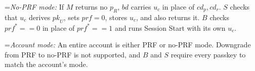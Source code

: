 \documentclass{article}
\newlength{\stanzagap}
\newlength{\notegap}
\newlength{\stanzawidth}
\newlength{\stanzabox}
\newenvironment{stanza}[1][\stanzawidth]
  {\par\addvspace{\stanzagap}%
   \setlength{\stanzabox}{\dimexpr\linewidth-\parindent\relax}%
   \ifdim\stanzabox>#1\setlength{\stanzabox}{#1}\fi
   \noindent\hspace*{\parindent}\begin{minipage}{\stanzabox}}
  {\end{minipage}\par\addvspace{\stanzagap}}
\begin{document}
\begin{stanza}
\vspace{\notegap}

{\leftskip=\parindent\noindent\textit{No-PRF mode:} If $M$ returns no $p_R$, $\mathit{bd}$ carries $u_c$ in place of $\mathit{cd}_p, \mathit{cd}_r$. $S$ checks that $u_c$ derives $\mathit{pk}_U$, sets $\mathit{prf} = 0$, stores $u_c$, and also returns it. $B$ checks $\mathit{prf}^* == 0$ in place of $\mathit{prf}^* == 1$ and runs Session Start with its own $u_c$.\par}

\vspace{\notegap}

{\leftskip=\parindent\noindent\textit{Account mode:} An entire account is either PRF or no-PRF mode. Downgrade from PRF to no-PRF is not supported, and $B$ and $S$ require every passkey to match the account's mode.\par}
\end{stanza}
\end{document}
